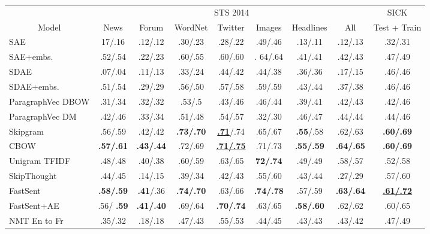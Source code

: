 \begin{table*}[ht]
\begin{center}
      {
        \begin{tabular}{l|cccccc|c|c}
          & \multicolumn{7}{c|}{STS 2014} & SICK \\
           \multicolumn{1}{c|}{Model} & News & Forum & WordNet & Twitter & Images & Headlines & All  & \multicolumn{1}{c}{Test + Train}  \\
          \hline
\hline
    SAE & 17/.16 & .12/.12 & 	.30/.23 & 	.28/.22 & 	.49/.46 & 	.13/.11 & 	.12/.13 & .32/.31 \\
          SAE+embs. & .52/.54 & .22/.23 &  .60/.55 &  .60/.60 & . 64/.64 & .41/.41 & .42/.43 & .47/.49\\
 SDAE & .07/.04 &  .11/.13& .33/.24 & .44/.42 & .44/.38 & .36/.36 & .17/.15 & .46/.46 \\
 SDAE+embs.  & .51/.54 & .29/.29	& .56/.50	& .57/.58	& .59/.59	& .43/.44	& .37/.38 & .46/.46 \\
          ParagraphVec DBOW & .31/.34 & .32/.32 & .53/.5 & .43/.46 & .46/.44 & .39/.41 & .42/.43 & .42/.46\\
          ParagraphVec DM & .42/.46 & .33/.34 & .51/.48 & .54/.57 & .32/.30 &  .46/.47 &  .44/.44 & .44/.46 \\
                  Skipgram &.56/.59&	.42/.42& \bf	.73/.70& \underline{\bf .71}/.74&	.65/.67& {\bf	.55}/.58&	.62/.63 & \bf .60/.69 \\
          CBOW & \bf .57/.61 & \bf	.43/.44	& .72/.69	&\underline{\bf .71/.75}&.71/.73& \bf	.55/.59&	\bf .64/.65 & \bf .60/.69 \\
Unigram TFIDF & .48/.48 & .40/.38 & .60/.59  & .63/.65 & \bf 72/.74 &.49/.49	&.58/.57 & .52/.58 \\
          \hline 
           SkipThought & .44/.45 & .14/.15 & .39/.34 & .42/.43 & .55/.60 & .43/.44 & .27/.29 & .57/.60\\
FastSent &  {\bf .58/.59} & {\bf .41}/.36 & \bf .74/.70 & .63/.66 &  \bf{.74/.78} & .57/.59 &  \bf .63/.64 & \underline{\bf .61/.72}\\
FastSent+AE & .56/ \bf{.59} & \bf{.41/.40} &  .69/.64 & \bf .70/.74 & .63/.65 &  \bf{.58/.60} &  .62/.62 & .60/.65 \\
          \hline 
          NMT En to Fr & .35/.32	& .18/.18	& .47/.43 & .55/.53	& .44/.45	& .43/.43 & .43/.42 & .47/.49 \\



\end{tabular}}
\end{center}
\end{table*}
